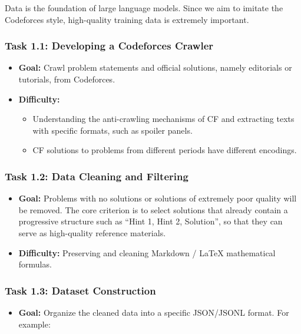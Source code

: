 \documentclass{article}
\begin{document}
Data is the foundation of large language models. Since we aim to imitate the Codeforces style, high-quality training data is extremely important.

\subsubsection*{Task 1.1: Developing a Codeforces Crawler}

\begin{itemize}
    \item \textbf{Goal:} Crawl problem statements and official solutions, namely editorials or tutorials, from Codeforces.
    \item \textbf{Difficulty:} \begin{itemize}
      \item Understanding the anti-crawling mechanisms of CF and extracting texts with specific formats, such as spoiler panels.
      \item CF solutions to problems from different periods have different encodings.
    \end{itemize}
\end{itemize}

\subsubsection*{Task 1.2: Data Cleaning and Filtering}

\begin{itemize}
    \item \textbf{Goal:} Problems with no solutions or solutions of extremely poor quality will be removed. The core criterion is to select solutions that already contain a progressive structure such as ``Hint 1, Hint 2, Solution'', so that they can serve as high-quality reference materials.
    \item \textbf{Difficulty:} Preserving and cleaning Markdown / LaTeX mathematical formulas.
\end{itemize}

\subsubsection*{Task 1.3: Dataset Construction}

\begin{itemize}
    \item \textbf{Goal:} Organize the cleaned data into a specific JSON/JSONL format. For example:
\end{itemize}
\end{document}
